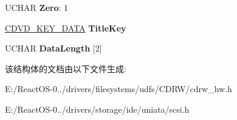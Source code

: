 \begin{DoxyCompactItemize}
\item 
\mbox{\label{struct___c_d_v_d___t_i_t_l_e___k_e_y___h_e_a_d_e_r_acd470918606cf79e2d072e9f2a8e2cd8}} 
U\+C\+H\+AR {\bfseries Zero}\+: 1
\item 
\mbox{\label{struct___c_d_v_d___t_i_t_l_e___k_e_y___h_e_a_d_e_r_a51a392342bd9c87b2186c914c3607e5d}} 
\hyperlink{struct___c_d_v_d___k_e_y___d_a_t_a}{C\+D\+V\+D\+\_\+\+K\+E\+Y\+\_\+\+D\+A\+TA} {\bfseries Title\+Key}
\item 
\mbox{\label{struct___c_d_v_d___t_i_t_l_e___k_e_y___h_e_a_d_e_r_a2ebf55bfc68a742b8b717424ed4d0a17}} 
U\+C\+H\+AR {\bfseries Data\+Length} \mbox{[}2\mbox{]}
\end{DoxyCompactItemize}


该结构体的文档由以下文件生成\+:\begin{DoxyCompactItemize}
\item 
E\+:/\+React\+O\+S-\/0../drivers/filesystems/udfs/\+C\+D\+R\+W/cdrw\+\_\+hw.\+h\item 
E\+:/\+React\+O\+S-\/0../drivers/storage/ide/uniata/scsi.\+h\end{DoxyCompactItemize}
